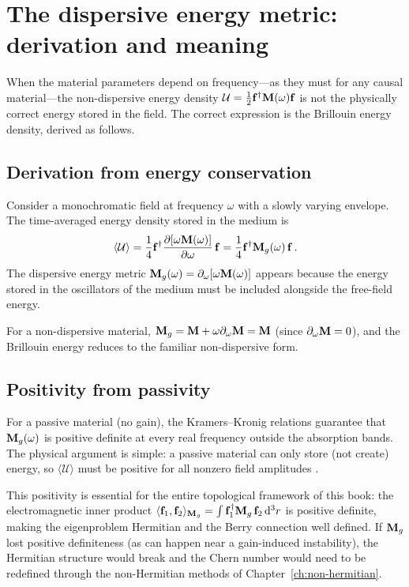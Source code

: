\section{The dispersive energy metric: derivation and meaning}
\label{sec:ch3-dispersive-derivation}

When the material parameters depend on frequency---as they must for
any causal material---the non-dispersive energy density
$\mathcal{U}=\frac{1}{2}\mathbf{f}^\dagger\mathbf{M}(\omega)\mathbf{f}$ is
not the physically correct energy stored in the field.  The correct
expression is the Brillouin energy density, derived as follows.

\subsection{Derivation from energy conservation}
\label{sec:ch3-brillouin-derivation}

Consider a monochromatic field at frequency $\omega$ with a slowly
varying envelope.  The time-averaged energy density stored in the
medium is \cite{gangaraj2016berry}
\begin{equation}\label{eq:ch3-brillouin-energy}
  \langle\mathcal{U}\rangle
  = \frac{1}{4}\mathbf{f}^\dagger
  \frac{\partial[\omega\mathbf{M}(\omega)]}{\partial\omega}\,\mathbf{f}
  = \frac{1}{4}\mathbf{f}^\dagger\mathbf{M}_g(\omega)\,\mathbf{f}\,.
\end{equation}
The dispersive energy metric $\mathbf{M}_g(\omega)
=\partial_\omega[\omega\mathbf{M}(\omega)]$ appears because the energy
stored in the oscillators of the medium must be included alongside
the free-field energy.

For a non-dispersive material,
$\mathbf{M}_g=\mathbf{M}+\omega\partial_\omega\mathbf{M}=\mathbf{M}$ (since
$\partial_\omega\mathbf{M}=0$), and the Brillouin energy reduces to
the familiar non-dispersive form.

\subsection{Positivity from passivity}
\label{sec:ch3-positivity}

For a passive material (no gain), the Kramers--Kronig relations
guarantee that $\mathbf{M}_g(\omega)$ is positive definite at every
real frequency outside the absorption bands.  The physical argument
is simple: a passive material can only store (not create) energy,
so $\langle\mathcal{U}\rangle$ must be positive for all nonzero
field amplitudes \cite{silveirinha2016bulk}.

This positivity is essential for the entire topological framework of
this book: the electromagnetic inner product
$\langle \mathbf{f}_1 , \mathbf{f}_2 \rangle_{\mathbf{M}_g}
=\int\mathbf{f}_1^\dagger\mathbf{M}_g\,\mathbf{f}_2\,\mathrm{d}^3 r$ is positive
definite, making the eigenproblem Hermitian and the Berry connection
well defined.  If $\mathbf{M}_g$ lost positive definiteness (as can happen
near a gain-induced instability), the Hermitian structure would break
and the Chern number would need to be redefined through the
non-Hermitian methods of Chapter~\ref{ch:non-hermitian}.


